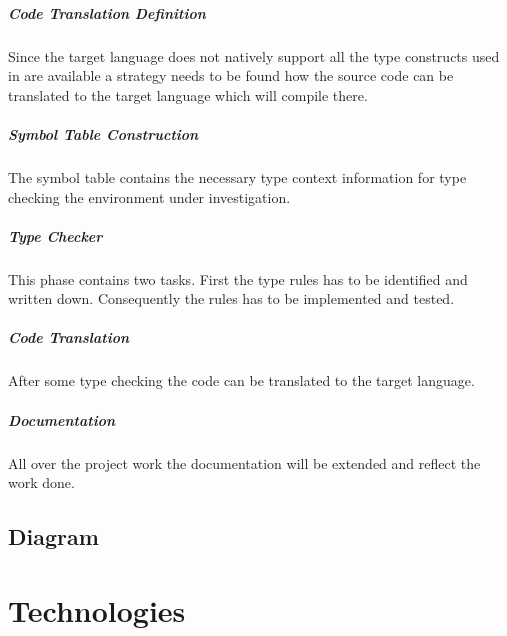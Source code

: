 \paragraph{Code Translation Definition}
Since the target language does not natively support all the type
constructs used in \ooplss are available a strategy needs to be found
how the source code can be translated to the target language which will
compile there.

\paragraph{Symbol Table Construction}
The symbol table contains the necessary type context information for
type checking the environment under investigation.

\paragraph{Type Checker}
This phase contains two tasks. First the type rules has to be identified
and written down. Consequently the rules has to be implemented and tested.

\paragraph{Code Translation}
After some type checking the code can be translated to the target language.

\paragraph{Documentation}
All over the project work the documentation will be extended and reflect the work done.

\section{Diagram}
\begin{sideways}
	\centering
	
\end{sideways}

\chapter{Technologies}

